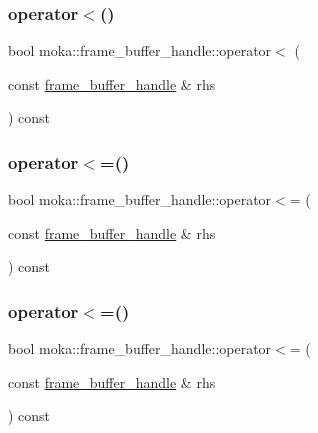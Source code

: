 \mbox{\label{structmoka_1_1frame__buffer__handle_a6647204ed60a12d61789981e99fa6c4f}} 
\subsubsection{\texorpdfstring{operator$<$()}{operator<()}\hspace{0.1cm}{\footnotesize\ttfamily [2/2]}}
{\footnotesize\ttfamily bool moka\+::frame\+\_\+buffer\+\_\+handle\+::operator$<$ (\begin{DoxyParamCaption}\item[{const \mbox{\hyperlink{structmoka_1_1frame__buffer__handle}{frame\+\_\+buffer\+\_\+handle}} \&}]{rhs }\end{DoxyParamCaption}) const}

\mbox{\label{structmoka_1_1frame__buffer__handle_aa624933fa41eacbe6900d7d79580629e}} 
\subsubsection{\texorpdfstring{operator$<$=()}{operator<=()}\hspace{0.1cm}{\footnotesize\ttfamily [1/2]}}
{\footnotesize\ttfamily bool moka\+::frame\+\_\+buffer\+\_\+handle\+::operator$<$= (\begin{DoxyParamCaption}\item[{const \mbox{\hyperlink{structmoka_1_1frame__buffer__handle}{frame\+\_\+buffer\+\_\+handle}} \&}]{rhs }\end{DoxyParamCaption}) const}

\mbox{\label{structmoka_1_1frame__buffer__handle_aa624933fa41eacbe6900d7d79580629e}} 
\subsubsection{\texorpdfstring{operator$<$=()}{operator<=()}\hspace{0.1cm}{\footnotesize\ttfamily [2/2]}}
{\footnotesize\ttfamily bool moka\+::frame\+\_\+buffer\+\_\+handle\+::operator$<$= (\begin{DoxyParamCaption}\item[{const \mbox{\hyperlink{structmoka_1_1frame__buffer__handle}{frame\+\_\+buffer\+\_\+handle}} \&}]{rhs }\end{DoxyParamCaption}) const}

